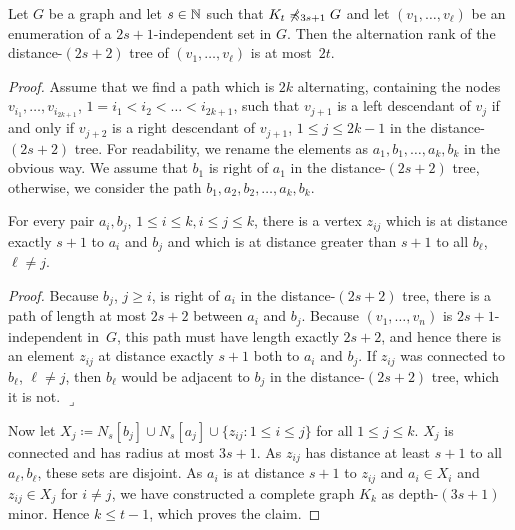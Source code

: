 \begin{lemma}\label{thm:alternation-rank-type-tree}
Let $G$ be a graph and let $s\in \mathbb{N}$ such that $K_t\not\preccurlyeq_{3s+1} G$ and let
$(v_1,\ldots, v_\ell)$ be an enumeration of a $2s+1$-independent set 
in $G$. Then the alternation rank of the distance-$(2s+2)$ tree of 
$(v_1,\ldots, v_\ell)$ is at most~$2t$. 
\end{lemma}
\begin{proof}
Assume that we find a path which is $2k$ alternating, 
containing the nodes $v_{i_1},\ldots, v_{i_{2k+1}}$, $1=i_1<i_2<\ldots <i_{2k+1}$, such that $v_{j+1}$ is a left descendant of $v_j$
if and only if $v_{j+2}$ is a right descendant of $v_{j+1}$, $1\leq j\leq 2k-1$ in
the distance-$(2s+2)$ tree.
For readability, we rename the elements as $a_1,b_1,\ldots, a_k,b_k$ in the 
obvious way. We assume that $b_1$ is right of $a_1$ in the distance-$(2s+2)$ 
tree, otherwise, we consider
the path $b_1,a_2,b_2,\ldots,a_k, b_k$. 

\begin{claim}
For every pair $a_i,b_j$, $1\leq i\leq k, i\leq j\leq k$, there
is a vertex $z_{ij}$ which is at distance exactly $s+1$ to 
$a_i$ and $b_j$ and which is at distance greater than $s+1$ 
to all $b_\ell$, $\ell\neq j$. 
\end{claim}

\noindent\textit{Proof.} 
Because $b_j$, $j\geq i$, is right of $a_i$ in the distance-$(2s+2)$ tree, 
there is a path of length at most $2s+2$ between $a_i$ and $b_j$. 
Because $(v_1,\ldots, v_n)$ is $2s+1$-independent in~$G$, this path
must have length exactly $2s+2$, and hence there is an element $z_{ij}$ 
at distance exactly $s+1$ both to $a_i$ and $b_j$. 
If $z_{ij}$ was connected to $b_\ell$, $\ell\neq j$, then $b_\ell$ would be adjacent 
to $b_j$ in the distance-$(2s+2)$ tree, which it is not. \hfill$\lrcorner$

\bigskip
Now let $X_j\coloneqq N_s[b_j]\cup N_s[a_j]\cup\{z_{ij} : 1\leq i\leq j\}$
for all $1\leq j\leq k$. $X_j$ is connected and has radius at most $3s+1$. 
As $z_{ij}$ has distance at least $s+1$ to all $a_\ell, b_\ell$, these sets 
are disjoint. 
As $a_i$ is at distance $s+1$ to $z_{ij}$ and 
$a_i\in X_i$ and $z_{ij}\in X_j$ for $i\neq j$, 
we have constructed a complete graph $K_k$ as depth-$(3s+1)$ minor. Hence 
$k\leq t-1$, which proves the claim. 
\end{proof}

%


